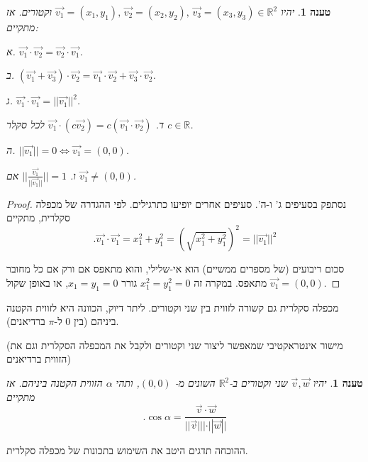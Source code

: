 \documentclass[12pt]{book}
\theoremstyle{plain}
\newtheorem{proposition}[theorem]{טענה}
\theoremstyle{definition}
\newcommand{\R}{\mathbb{R}}
\begin{document}
\begin{proposition}
יהיו \(\vec{v_{1}}=(x_{1},y_{1}),\,\vec{v_{2}}=(x_{2},y_{2}),\,\vec{v_{3}}=(x_{3},y_{3})\in\R^{2}\)
וקטורים. אז מתקיים:

א. 
\(\vec{v_{1}}\cdot\vec{v_{2}}=\vec{v_{2}}\cdot\vec{v_{1}}\).

ב. 
\((\vec{v_{1}}+\vec{v_{3}})\cdot\vec{v_{2}}=\vec{v_{1}}\cdot\vec{v_{2}}+\vec{v_{3}}\cdot\vec{v_{2}}\).

ג. \(\vec{v_{1}}\cdot\vec{v_{1}}=||\vec{v_{1}}||^{2}\).

ד. \(\vec{v_{1}}\cdot(c\vec{v_{2}})=c(\vec{v_{1}}\cdot\vec{v_{2}})\) לכל סקלר \(c\in\R\).

ה. \(||\vec{v_{1}}||=0\iff\vec{v_{1}}=(0,0)\).

ו. \(||\frac{\vec{v_{1}}}{||\vec{v_{1}}||}||=1\) אם \(\vec{v_{1}}\neq(0,0)\).
\end{proposition}

\begin{proof}
נסתפק בסעיפים ג' ו-ה'. סעיפים אחרים יופיעו כתרגילים. לפי ההגדרה של מכפלה סקלרית, מתקיים
\begin{equation*}
.\vec{v_{1}}\cdot\vec{v_{1}}=x_{1}^{2}+y_{1}^{2}=\left(\sqrt{x_{1}^{2}+y_{1}^{2}}\right)^{2}=||\vec{v_{1}}||^{2}
\end{equation*}

סכום ריבועים (של מספרים ממשיים) הוא אי-שלילי, והוא מתאפס אם ורק אם
כל מחובר מתאפס. במקרה זה \(x_{1}^{2}=y_{1}^{2}=0\) גורר \(x_{1}=y_{1}=0\),
או באופן שקול \(\vec{v_{1}}=(0,0)\).
\end{proof}

מכפלה סקלרית גם קשורה לזווית בין שני וקטורים. ליתר דיוק, הכוונה היא
לזווית הקטנה ביניהם (בין 
\(0\) ל-\(\pi\) ברדיאנים).

\begin{center}
	(מישור אינטראקטיבי שמאפשר ליצור שני וקטורים ולקבל את המכפלה הסקלרית
	וגם את הזווית ברדיאנים)
\end{center}

\begin{proposition}
יהיו \(\vec{v},\vec{w}\) שני וקטורים ב-\(\mathbb{R}^{2}\)
השונים מ-
\((0,0)\), ותהי \(\alpha\) הזווית הקטנה ביניהם. אז
מתקיים
\begin{equation}\label{eq:cosine-scalar}
	.\cos\alpha=\frac{\vec{v}\cdot\vec{w}}{||\vec{v}|||\cdot||\vec{w}||}
\end{equation}
\end{proposition}
ההוכחה תדגים היטב את השימוש בתכונות של מכפלה סקלרית.
\end{document}
